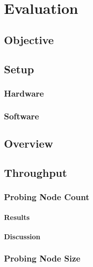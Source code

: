 \chapter{Evaluation}
\label{ch:evaluation}

\section{Objective}

\section{Setup}

\subsection{Hardware}

\subsection{Software}

\section{Overview}

\section{Throughput}
\label{ch:evaluation:se:throughput}

\subsection{Probing Node Count}

\subsubsection{Results}

\subsubsection{Discussion}

\subsection{Probing Node Size}

